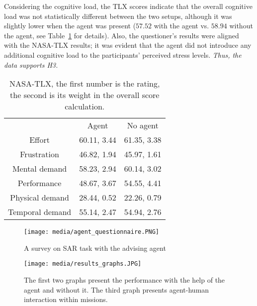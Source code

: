 Considering the cognitive load, the TLX scores indicate that the overall cognitive load was not statistically different between the two setups, although it was slightly lower when the agent was present ($57.52$ with the agent vs. $58.94$ without the agent, see Table~\ref{tab:tlx} for details). Also, the questioner's results were aligned with the NASA-TLX results; it was evident that the agent did not introduce any additional cognitive load to the participants' perceived stress levels.
{\it Thus, the data supports H3.}

\begin{table}[]
    \centering
    \begin{tabular}{c|c|c}
         & Agent & No agent \\
        Effort & 60.11, 3.44 & 61.35, 3.38 \\
        Frustration & 46.82, 1.94 & 45.97, 1.61 \\
        Mental demand & 58.23, 2.94 & 60.14, 3.02 \\
        Performance & 48.67, 3.67 & 54.55, 4.41 \\
        Physical demand & 28.44, 0.52 & 22.26, 0.79 \\
        Temporal demand & 55.14, 2.47 &  54.94, 2.76 \\
    \end{tabular}
    \caption{NASA-TLX, the first number is the rating, the second is its weight in the overall score calculation.}
    \label{tab:tlx}
\end{table}
\begin{figure}[htbp]
\centering
\texttt{[image: media/agent\_questionnaire.PNG]} %
\vspace{-10pt}
\caption{ \small A survey on SAR task with the advising agent}
\label{fig:sar_survey}
\end{figure}
\begin{figure}[htbp]
\centering
\texttt{[image: media/results\_graphs.JPG]} %
\vspace{-10pt}
\caption{ \small The first two graphs present the performance with the help of the agent and without it. The third graph presents agent-human interaction within missions. }
\label{fig:results_graphs}
\end{figure}
